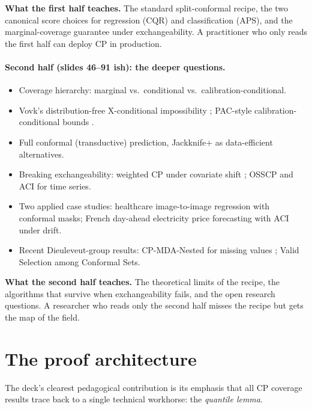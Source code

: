 \documentclass[letterpaper,11pt,leqno]{article}
\begin{document}
\begin{explain}
\textbf{What the first half teaches.} The standard split-conformal recipe, the two canonical score choices for regression (CQR) and classification (APS), and the marginal-coverage guarantee under exchangeability. A practitioner who only reads the first half can deploy CP in production.
\end{explain}

\paragraph{Second half (slides 46--91 ish): the deeper questions.}
\begin{itemize}
\item Coverage hierarchy: marginal vs.~conditional vs.~calibration-conditional.
\item Vovk's distribution-free X-conditional impossibility \cite{vovk2012conditional}; PAC-style calibration-conditional bounds \cite{bian2023calibration}.
\item Full conformal (transductive) prediction, Jackknife+ \cite{barber2021jackknifeplus} as data-efficient alternatives.
\item Breaking exchangeability: weighted CP under covariate shift \cite{tibshirani2019weighted}; OSSCP and ACI \cite{gibbs2021aci} for time series.
\item Two applied case studies: healthcare image-to-image regression with conformal masks; French day-ahead electricity price forecasting with ACI under drift.
\item Recent Dieuleveut-group results: CP-MDA-Nested for missing values \cite{zaffran2024missing}; Valid Selection among Conformal Sets.
\end{itemize}

\begin{explain}
\textbf{What the second half teaches.} The theoretical limits of the recipe, the algorithms that survive when exchangeability fails, and the open research questions. A researcher who reads only the second half misses the recipe but gets the map of the field.
\end{explain}

\section{The proof architecture}\label{s:proof}

The deck's clearest pedagogical contribution is its emphasis that all CP coverage results trace back to a single technical workhorse: the \emph{quantile lemma}.
\end{document}
